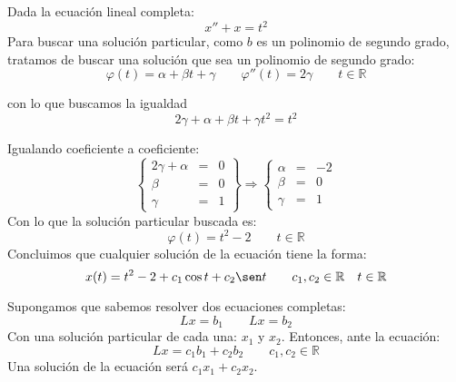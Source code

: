 \begin{ejemplo}
    Dada la ecuación lineal completa:
    \begin{equation*}
        x'' + x = t^2
    \end{equation*}
    Para buscar una solución particular, como $b$ es un polinomio de segundo grado, tratamos de buscar una solución que sea un polinomio de segundo grado:
    \begin{equation*}
        \varphi(t) = \alpha + \beta t + \gamma \qquad  \varphi''(t) = 2\gamma \qquad t\in \mathbb{R}
    \end{equation*}

    con lo que buscamos la igualdad
    \begin{equation*}
        2\gamma + \alpha + \beta t + \gamma t^2 = t^2
    \end{equation*}

    Igualando coeficiente a coeficiente:
    \begin{equation*}
        \left\{\begin{array}{rll}
                2\gamma + \alpha &=& 0 \\
                \beta &=& 0 \\
                \gamma &=& 1
        \end{array}\right\} \Longrightarrow 
        \left\{\begin{array}{rlr}
                \alpha &=& -2 \\
                \beta &=& 0 \\
                \gamma &=& 1
        \end{array}\right. 
    \end{equation*}
    Con lo que la solución particular buscada es:
    \begin{equation*}
        \varphi(t) = t^2 - 2 \qquad t\in \mathbb{R}
    \end{equation*}
    Concluimos que cualquier solución de la ecuación tiene la forma:
    \begin{equation*}
        x(t) = t^2 - 2 + c_1 \cos t + c_2 \sen t \qquad c_1,c_2\in \mathbb{R} \quad t\in \mathbb{R}
    \end{equation*}
\end{ejemplo}

\begin{prop}
Supongamos que sabemos resolver dos ecuaciones completas:
\begin{equation*}
    Lx = b_1 \qquad Lx = b_2
\end{equation*}
Con una solución particular de cada una: $x_1$ y $x_2$. Entonces, ante la ecuación:
\begin{equation*}
    Lx = c_1 b_1 + c_2 b_2 \qquad c_1,c_2\in \mathbb{R}
\end{equation*}
Una solución de la ecuación será $c_1x_1 + c_2x_2$.
\end{prop}


